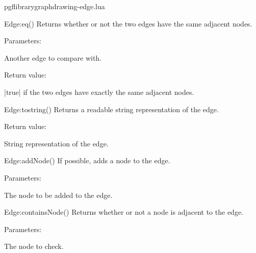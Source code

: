 
\begin{filedescription}{pgflibrarygraphdrawing-edge.lua}


\begin{luacommand}{{Edge:\textunderscore{}\textunderscore{}eq}()}
Returns whether or not the two edges have the same adjacent nodes. 

Parameters:
\begin{parameterdescription}
	\item[\meta{other}] Another edge to compare with. 
\end{parameterdescription}


Return value:
\begin{parameterdescription} 
  \item[] |true| if the two edges have exactly the same adjacent nodes. 
\end{parameterdescription}


\end{luacommand}
\begin{luacommand}{{Edge:\textunderscore{}\textunderscore{}tostring}()}
Returns a readable string representation of the edge. 


Return value:
\begin{parameterdescription} 
  \item[] String representation of the edge. 
\end{parameterdescription}


\end{luacommand}
\begin{luacommand}{{Edge:addNode}()}
If possible, adds a node to the edge. 

Parameters:
\begin{parameterdescription}
	\item[\meta{node}] The node to be added to the edge. 
\end{parameterdescription}



\end{luacommand}
\begin{luacommand}{{Edge:containsNode}()}
Returns whether or not a node is adjacent to the edge. 

Parameters:
\begin{parameterdescription}
	\item[\meta{node}] The node to check. 
\end{parameterdescription}



\end{luacommand}
\end{filedescription}
